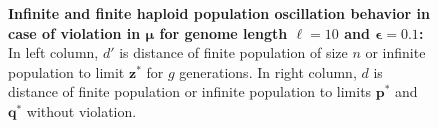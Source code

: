 \begin{figure}[h]
\begin{center}
\hspace{-3em}%
\vspace{-0.5em} \hspace{-3em}%


\caption{\textbf{Infinite and finite haploid population oscillation behavior in case of violation in $\bm{\mu}$ for genome length $\ell = 10$ and $\bm{\epsilon} = 0.1$:} 
  In left column, $d'$ is distance of finite population of size $n$ or infinite population to limit $\bm{z}^\ast$ for $g$ generations. In right column, $d$ is distance of finite population or infinite population to limits $\bm{p}^\ast$ and $\bm{q}^\ast$ without violation.}
\label{oscillation_10h_vio_mu_0.1}
\end{center}
\end{figure}

